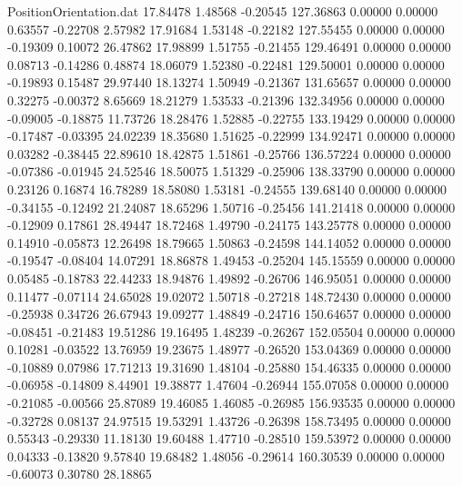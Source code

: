 \begin{filecontents}{PositionOrientation.dat}
  17.84478    1.48568   -0.20545   127.36863    0.00000    0.00000    0.63557   -0.22708    2.57982
  17.91684    1.53148   -0.22182   127.55455    0.00000    0.00000   -0.19309    0.10072   26.47862
  17.98899    1.51755   -0.21455   129.46491    0.00000    0.00000    0.08713   -0.14286    0.48874
  18.06079    1.52380   -0.22481   129.50001    0.00000    0.00000   -0.19893    0.15487   29.97440
  18.13274    1.50949   -0.21367   131.65657    0.00000    0.00000    0.32275   -0.00372    8.65669
  18.21279    1.53533   -0.21396   132.34956    0.00000    0.00000   -0.09005   -0.18875   11.73726
  18.28476    1.52885   -0.22755   133.19429    0.00000    0.00000   -0.17487   -0.03395   24.02239
  18.35680    1.51625   -0.22999   134.92471    0.00000    0.00000    0.03282   -0.38445   22.89610
  18.42875    1.51861   -0.25766   136.57224    0.00000    0.00000   -0.07386   -0.01945   24.52546
  18.50075    1.51329   -0.25906   138.33790    0.00000    0.00000    0.23126    0.16874   16.78289
  18.58080    1.53181   -0.24555   139.68140    0.00000    0.00000   -0.34155   -0.12492   21.24087
  18.65296    1.50716   -0.25456   141.21418    0.00000    0.00000   -0.12909    0.17861   28.49447
  18.72468    1.49790   -0.24175   143.25778    0.00000    0.00000    0.14910   -0.05873   12.26498
  18.79665    1.50863   -0.24598   144.14052    0.00000    0.00000   -0.19547   -0.08404   14.07291
  18.86878    1.49453   -0.25204   145.15559    0.00000    0.00000    0.05485   -0.18783   22.44233
  18.94876    1.49892   -0.26706   146.95051    0.00000    0.00000    0.11477   -0.07114   24.65028
  19.02072    1.50718   -0.27218   148.72430    0.00000    0.00000   -0.25938    0.34726   26.67943
  19.09277    1.48849   -0.24716   150.64657    0.00000    0.00000   -0.08451   -0.21483   19.51286
  19.16495    1.48239   -0.26267   152.05504    0.00000    0.00000    0.10281   -0.03522   13.76959
  19.23675    1.48977   -0.26520   153.04369    0.00000    0.00000   -0.10889    0.07986   17.71213
  19.31690    1.48104   -0.25880   154.46335    0.00000    0.00000   -0.06958   -0.14809    8.44901
  19.38877    1.47604   -0.26944   155.07058    0.00000    0.00000   -0.21085   -0.00566   25.87089
  19.46085    1.46085   -0.26985   156.93535    0.00000    0.00000   -0.32728    0.08137   24.97515
  19.53291    1.43726   -0.26398   158.73495    0.00000    0.00000    0.55343   -0.29330   11.18130
  19.60488    1.47710   -0.28510   159.53972    0.00000    0.00000    0.04333   -0.13820    9.57840
  19.68482    1.48056   -0.29614   160.30539    0.00000    0.00000   -0.60073    0.30780   28.18865

\end{filecontents}
